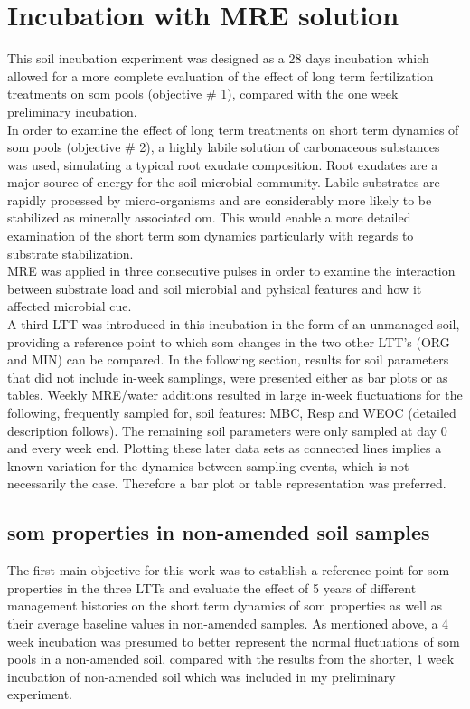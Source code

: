 \section{Incubation with MRE solution}
	This soil incubation experiment was designed as a 28 days incubation which allowed for a more complete evaluation of the effect of long term fertilization treatments on \gls{som} pools (objective \# 1), compared with the one week  preliminary incubation.\\
	In order to examine the effect of long term treatments on short term dynamics of \gls{som} pools (objective \# 2), a highly labile solution of carbonaceous substances was used, simulating a typical root exudate composition. Root exudates are a major source of energy for the soil microbial community. Labile substrates are rapidly processed by micro-organisms and are considerably more likely to be stabilized as minerally associated \gls{om}. This would enable a more detailed examination of the short term \gls{som} dynamics particularly with regards to substrate stabilization. \\
	MRE was applied in three consecutive pulses in order to examine the interaction between substrate load and soil microbial and pyhsical features and how it affected microbial \gls{cue}. \\
	A third LTT was introduced in this incubation in the form of an unmanaged soil, providing a reference point to which \gls{som} changes in the two other LTT's (ORG and MIN) can be compared.
	In the following section, results for soil parameters that did not include in-week samplings, were presented either as bar plots  or as tables.	Weekly MRE/water additions resulted in large in-week fluctuations for the following, frequently sampled for, soil features: MBC, Resp and WEOC (detailed description follows). The remaining soil parameters were only sampled at day 0 and every week end. Plotting these later data sets as connected lines implies a known variation for the dynamics between sampling events, which is not necessarily the case. Therefore a bar plot or table representation was preferred.

	\subsection{\gls{som} properties in non-amended soil samples}

		The first main objective for this work was to establish a reference point  for \gls{som} properties in the three LTTs and evaluate the effect of 5 years of different management histories on the short term dynamics of \gls{som} properties as well as their average baseline values in non-amended samples. As mentioned above, a 4 week incubation was presumed  to better represent the normal fluctuations of \gls{som} pools in a non-amended soil, compared with the results from the shorter, 1 week incubation of non-amended soil which was  included in my preliminary experiment.


